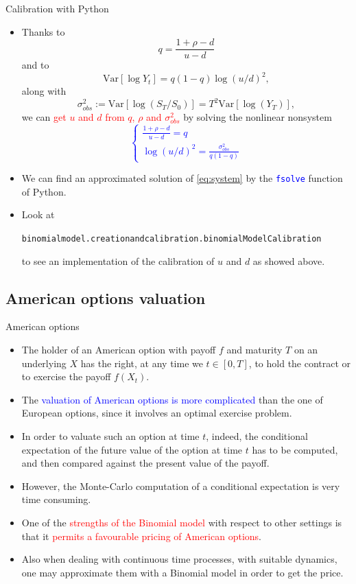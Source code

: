 \documentclass[9 pt]{beamer} %
\def \blue {\textcolor{blue}}
\def \red {\textcolor{red}}
\begin{document}
\begin{frame}{Calibration with Python}
\begin{itemize}
\item Thanks to 
$$
q=\frac{1+\rho-d}{u-d}
$$
and to
$$
\text{Var}[\log{Y_t}]=q(1-q)\log(u/d)^2,
$$
along with
$$
\sigma_{obs}^2:=\text{Var}[\log(S_T/S_0)]=T^2 \text{Var}[\log(Y_T)],
$$
we can \red{get $u$ and $d$ from $q$, $\rho$ and $\sigma_{obs}^2$} by solving the nonlinear nonsystem
\blue{\begin{equation}\label{eq:system}
\begin{cases}
\frac{1+\rho-d}{u-d}=q \\
\log(u/d)^2 = \frac{\sigma_{obs}^2}{q(1-q)}
\end{cases}
\end{equation}}
\item We can find an approximated solution of \eqref{eq:system} by the \blue{\texttt{fsolve}} function of Python.
\item Look at 
\begin{center}
\texttt{binomialmodel.creationandcalibration.binomialModelCalibration}
\end{center}
to see an implementation of the calibration of $u$ and $d$ as showed above.
\end{itemize}
\end{frame}

\subsection{American options valuation}

\frame{  \tableofcontents[
    sectionstyle=show/shaded,
    subsectionstyle=show/shaded/shaded,
    subsubsectionstyle=show/shaded/shaded/shaded
    ]}

\begin{frame}{American options}
\begin{itemize}
\item The holder of an American option with payoff $f$ and maturity $T$ on an underlying $X$ has the right, at any time we $t\in [0,T]$, to hold the contract or to  exercise the payoff $f(X_t)$.
\item The \blue{valuation of American options is more complicated} than the one of European options, since it involves an optimal exercise problem.
\item In order to valuate such an option at time $t$, indeed, the conditional expectation of the future value of the option at time $t$ has to be computed, and then compared against the present value of the payoff.
\item However, the Monte-Carlo computation of a conditional expectation is very time consuming.
\item One of the \red{strengths of the Binomial model} with respect to other settings is that it \red{permits a favourable pricing of American options}.
\item Also when dealing with continuous time processes, with suitable dynamics, one may approximate them with a Binomial model in order to get the price. 
\end{itemize}
\end{frame}
\end{document}
